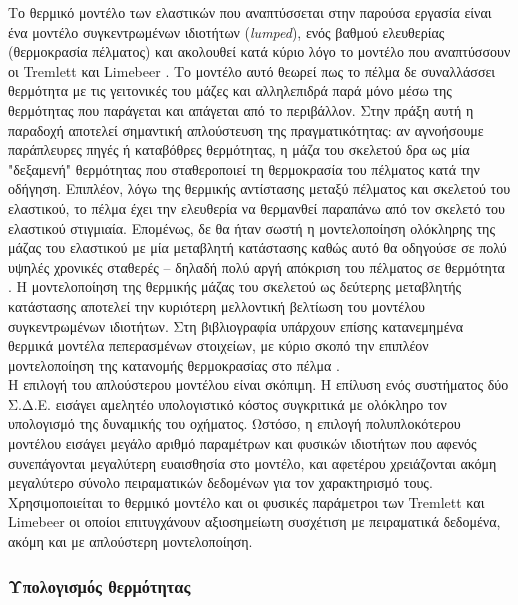 
\label{subsec:thermal_model}

Το θερμικό μοντέλο των ελαστικών που αναπτύσσεται στην παρούσα εργασία είναι ένα μοντέλο
συγκεντρωμένων ιδιοτήτων (\textit{lumped}), ενός βαθμού ελευθερίας (θερμοκρασία πέλματος)
και ακολουθεί κατά κύριο λόγο το μοντέλο που αναπτύσσουν οι Tremlett και Limebeer \cite{Tremlett2016}.
Το μοντέλο αυτό θεωρεί πως το πέλμα δε συναλλάσσει θερμότητα με τις γειτονικές του μάζες
και αλληλεπιδρά παρά μόνο μέσω της θερμότητας που παράγεται και απάγεται από το περιβάλλον.
Στην πράξη αυτή η παραδοχή αποτελεί σημαντική απλούστευση της πραγματικότητας: αν αγνοήσουμε
παράπλευρες πηγές ή καταβόθρες θερμότητας, η μάζα του σκελετού δρα ως μία "δεξαμενή" θερμότητας
που σταθεροποιεί τη θερμοκρασία του πέλματος κατά την οδήγηση. Επιπλέον, λόγω της θερμικής
αντίστασης μεταξύ πέλματος και σκελετού του ελαστικού, το πέλμα έχει την ελευθερία να
θερμανθεί παραπάνω από τον σκελετό του ελαστικού στιγμιαία. Επομένως, δε θα ήταν σωστή
η μοντελοποίηση ολόκληρης της μάζας του ελαστικού με μία μεταβλητή κατάστασης καθώς αυτό θα
οδηγούσε σε πολύ υψηλές χρονικές σταθερές -- δηλαδή πολύ αργή απόκριση του πέλματος
σε θερμότητα \cite{West2022}. Η μοντελοποίηση της θερμικής μάζας του σκελετού ως δεύτερης μεταβλητής
κατάστασης αποτελεί την κυριότερη μελλοντική βελτίωση του μοντέλου συγκεντρωμένων ιδιοτήτων.
Στη βιβλιογραφία υπάρχουν επίσης κατανεμημένα θερμικά μοντέλα πεπερασμένων στοιχείων, με κύριο σκοπό
την επιπλέον μοντελοποίηση της κατανομής θερμοκρασίας στο πέλμα \cite{Farroni2014TRT}. \\[0.2cm]

Η επιλογή του απλούστερου μοντέλου είναι σκόπιμη. Η επίλυση ενός συστήματος
δύο Σ.Δ.Ε. εισάγει αμελητέο υπολογιστικό κόστος συγκριτικά με ολόκληρο τον υπολογισμό
της δυναμικής του οχήματος. Ωστόσο, η επιλογή πολυπλοκότερου μοντέλου εισάγει μεγάλο
αριθμό παραμέτρων και φυσικών ιδιοτήτων που αφενός συνεπάγονται μεγαλύτερη ευαισθησία
στο μοντέλο, και αφετέρου χρειάζονται ακόμη μεγαλύτερο σύνολο πειραματικών 
δεδομένων για τον χαρακτηρισμό τους. Χρησιμοποιείται το θερμικό μοντέλο
και οι φυσικές παράμετροι των Tremlett και Limebeer \cite{Tremlett2016} οι οποίοι
επιτυγχάνουν αξιοσημείωτη συσχέτιση με πειραματικά δεδομένα, ακόμη και με απλούστερη
μοντελοποίηση.

\subsubsection{Υπολογισμός θερμότητας}

